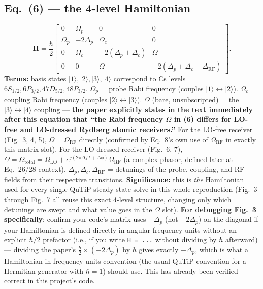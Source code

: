 \documentclass[11pt]{article}
\begin{document}
\subsection*{Eq.~(6) --- the 4-level Hamiltonian}
\begin{equation}
\mathbf H = \frac{\hbar}{2}
\begin{bmatrix}
0 & \Omega_p & 0 & 0\\
\Omega_p & -2\Delta_p & \Omega_c & 0\\
0 & \Omega_c & -2(\Delta_p+\Delta_c) & \Omega\\
0 & 0 & \Omega & -2(\Delta_p+\Delta_c+\Delta_\text{RF})
\end{bmatrix}. \tag{6}
\end{equation}
\textbf{Terms:} basis states $|1\rangle,|2\rangle,|3\rangle,|4\rangle$
correspond to Cs levels $6S_{1/2}, 6P_{3/2}, 47D_{5/2}, 48P_{3/2}$.
$\Omega_p$ = probe Rabi frequency (couples $|1\rangle\leftrightarrow|2\rangle$).
$\Omega_c$ = coupling Rabi frequency (couples
$|2\rangle\leftrightarrow|3\rangle$). $\Omega$ (bare, unsubscripted) =
the $|3\rangle\leftrightarrow|4\rangle$ coupling --- \textbf{the paper
explicitly states in the text immediately after this equation that
``the Rabi frequency $\Omega$ in (6) differs for LO-free and LO-dressed
Rydberg atomic receivers.''} For the LO-free receiver (Fig.~3, 4, 5),
$\Omega=\Omega_\text{RF}$ directly (confirmed by Eq.~8's own use of
$\Omega_\text{RF}$ in exactly this matrix slot). For the LO-dressed
receiver (Fig.~6, 7), $\Omega=\Omega_\text{total}=\Omega_\text{LO}+e^{j(2\pi\Delta f\,t+\Delta\phi)}\Omega_\text{RF}$
(a complex phasor, defined later at Eq.~26/28 context). $\Delta_p,\Delta_c,\Delta_\text{RF}$
= detunings of the probe, coupling, and RF fields from their respective
transitions.
\textbf{Significance:} this is \emph{the} Hamiltonian used for every
single QuTiP steady-state solve in this whole reproduction (Fig.~3
through Fig.~7 all reuse this exact 4-level structure, changing only
which detunings are swept and what value goes in the $\Omega$ slot).
\textbf{For debugging Fig.~3 specifically}: confirm your code's matrix
uses $-\Delta_p$ (not $-2\Delta_p$) on the diagonal if your Hamiltonian
is defined directly in angular-frequency units without an explicit
$\hbar/2$ prefactor (i.e., if you write \texttt{H = ...} without
dividing by $\hbar$ afterward) --- dividing the paper's $\frac{\hbar}{2}\times(-2\Delta_p)$
by $\hbar$ gives exactly $-\Delta_p$, which is what a
Hamiltonian-in-frequency-units convention (the usual QuTiP convention
for a Hermitian generator with $\hbar=1$) should use. This has already
been verified correct in this project's code.
\end{document}
